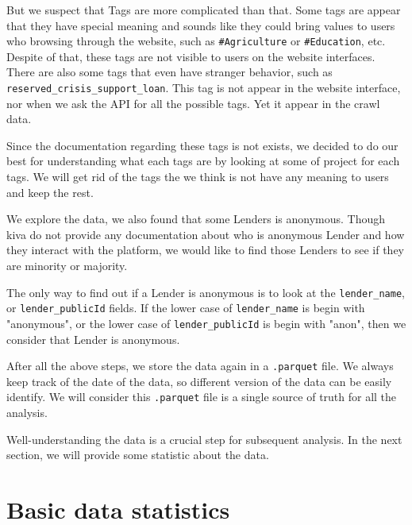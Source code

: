 But we suspect that Tags are more complicated than that.
Some tags are appear that they have special meaning and sounds like they could bring values to users who browsing through the website,
such as \lstinline|#Agriculture| or \lstinline|#Education|, etc.
Despite of that, these tags are not visible to users on the website interfaces.
There are also some tags that even have stranger behavior, such as \lstinline|reserved_crisis_support_loan|.
This tag is not appear in the website interface, nor when we ask the API for all the possible tags.
Yet it appear in the crawl data.

Since the documentation regarding these tags is not exists,
we decided to do our best for understanding what each tags are by looking at some of project for each tags.
We will get rid of the tags the we think is not have any meaning to users and keep the rest.



We explore the data, we also found that some Lenders is anonymous.
Though kiva do not provide any documentation about who is anonymous Lender and how they interact with the platform,
we would like to find those Lenders to see if they are minority or majority.


The only way to find out if a Lender is anonymous is to look at the \lstinline|lender_name|,
or \lstinline|lender_publicId| fields.
If the lower case of \lstinline|lender_name| is begin with "anonymous",
or the lower case of \lstinline|lender_publicId| is begin with "anon",
then we consider that Lender is anonymous.


After all the above steps, we store the data again in a \lstinline|.parquet| file.
We always keep track of the date of the data, so different version of the data can be easily identify.
We will consider this \lstinline|.parquet| file is a single source of truth for all the analysis.

Well-understanding the data is a crucial step for subsequent analysis.
In the next section, we will provide some statistic about the data.

\section{Basic data statistics}

